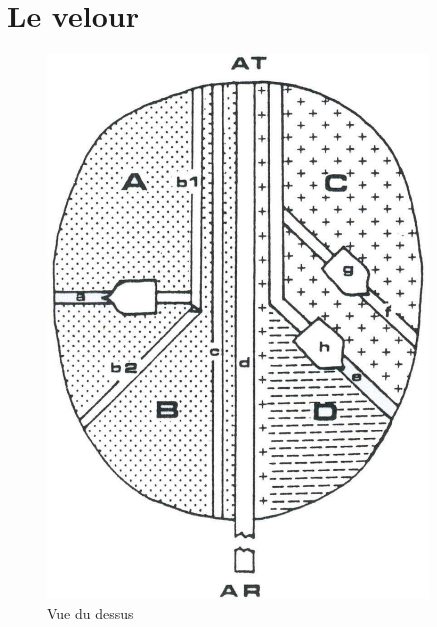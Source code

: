 \section*{Le velour}
\begin{figure}
\centering
	\includegraphics*[width=0.90\textwidth]{top}
   \caption{Vue du dessus}
   \label{FIG:velour}
\end{figure}

